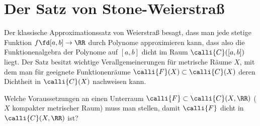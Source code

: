 \section{Der Satz von Stone-Weierstraß}

Der klassische Approximationssatz von Weierstraß besagt, dass man jede 
stetige Funktion $f\fd [a,b]\to \RR$  durch Polynome 
approximieren kann, dass also die Funktionenalgebra der Polynome auf 
$[a,b]$ dicht im Raum $\calli{C}( [a,b] )$ liegt. Der Satz besitzt 
wichtige Verallgemeinerungen für  metrische 
Räume $X$, mit dem man für geeignete Funktionenräume 
$\calli{F}(X)\subset \calli{C}(X)$ 
deren Dichtheit in $\calli{C}(X)$ nachweisen kann. 

\begin{frage}\label{09_appro}
  Welche Voraussetzungen an einen Unterraum 
  $\calli{F} \subset \calli{C}(X,\RR)$ ($X$ kompakter metrischer 
  Raum) muss man {\zB} stellen, damit $\calli{F}$ dicht in $\calli{C}(X,\RR)$ 
  ist?
\end{frage}

